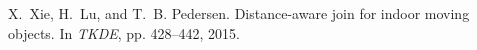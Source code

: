 \begin{frame}[allowframebreaks]
\begin{thebibliography}{99}
{%
%
%
%

X.~Xie, H.~Lu, and T.~B. Pedersen.
\newblock Distance-aware join for indoor moving objects.
\newblock In {\em TKDE}, pp. 428--442, 2015.

}
\end{thebibliography}

\end{frame}
